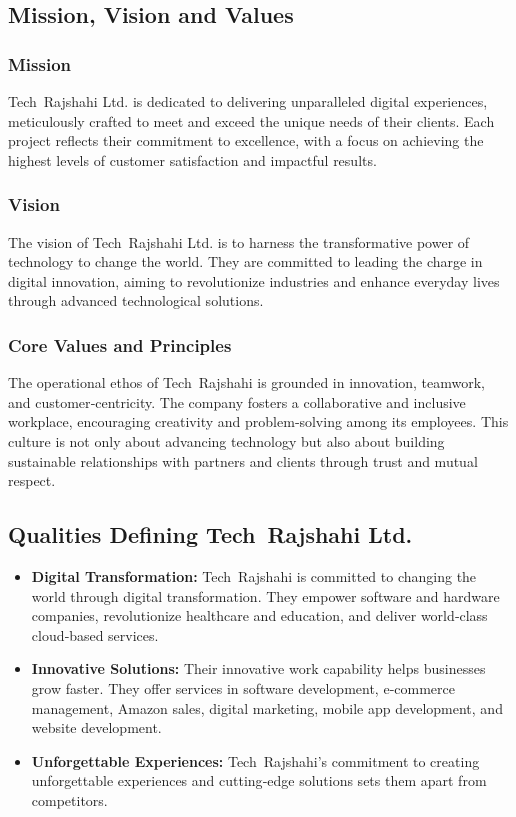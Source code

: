 \documentclass[12pt,a4paper]{article}
\begin{document}
\newpage
\subsection{Mission, Vision and Values}
\subsubsection{Mission}
Tech Rajshahi Ltd. is dedicated to delivering unparalleled digital experiences, meticulously crafted to meet and exceed the unique needs of their clients. Each project reflects their commitment to excellence, with a focus on achieving the highest levels of customer satisfaction and impactful results.

\subsubsection{Vision}
The vision of Tech Rajshahi Ltd. is to harness the transformative power of technology to change the world. They are committed to leading the charge in digital innovation, aiming to revolutionize industries and enhance everyday lives through advanced technological solutions.

\subsubsection{Core Values and Principles}
The operational ethos of Tech Rajshahi is grounded in innovation, teamwork, and customer‑centricity.  The company fosters a collaborative and inclusive workplace, encouraging creativity and problem‑solving among its employees.  This culture is not only about advancing technology but also about building sustainable relationships with partners and clients through trust and mutual respect.

\subsection{Qualities Defining Tech Rajshahi Ltd.}
\begin{itemize}
    \item \textbf{Digital Transformation:} Tech Rajshahi is committed to changing the world through digital transformation. They empower software and hardware companies, revolutionize healthcare and education, and deliver world‑class cloud‑based services.
    \item \textbf{Innovative Solutions:} Their innovative work capability helps businesses grow faster. They offer services in software development, e‑commerce management, Amazon sales, digital marketing, mobile app development, and website development.
    \item \textbf{Unforgettable Experiences:} Tech Rajshahi’s commitment to creating unforgettable experiences and cutting‑edge solutions sets them apart from competitors.
\end{itemize}
\end{document}
